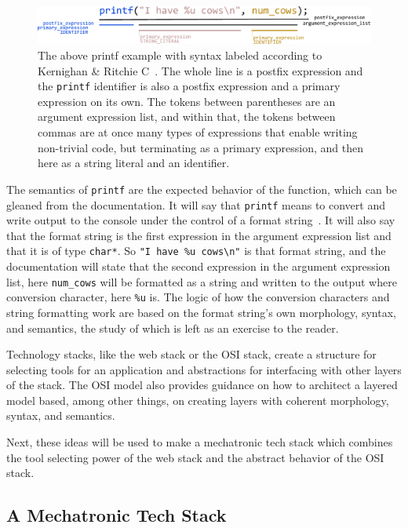 \documentclass[english,12pt,a4paper,pdftex,eng,utf8]{aaltothesis}
\begin{document}
\begin{figure}[h]
  \centering
  \includegraphics[width=\textwidth]{assets/printf_syntax}
  \cprotect\caption{The above printf example with syntax labeled according to Kernighan {\&} Ritchie C~\cite{Kernighan1978}.  The whole line is a postfix expression and the \verb|printf| identifier is also a postfix expression and a primary expression on its own.  The tokens between parentheses are an argument expression list, and within that, the tokens between commas are at once many types of expressions that enable writing non-trivial code, but terminating as a primary expression, and then here as a string literal and an identifier.}\label{fig:printf_syntax}
\end{figure}

The semantics of \verb|printf| are the expected behavior of the function, which can be gleaned from the documentation. It will say that \verb|printf| means to convert and write output to the console under the control of a format string~\cite{Kernighan1978}.  It will also say that the format string is the first expression in the argument expression list and that it is of type \verb|char*|.  So \verb|"I have %u cows\n"| is that format string, and the documentation will state that the second expression in the argument expression list, here \verb|num_cows| will be formatted as a string and written to the output where conversion character, here \verb|%u| is.  The logic of how the conversion characters and string formatting work are based on the format string's own morphology, syntax, and semantics, the study of which is left as an exercise to the reader.

Technology stacks, like the web stack or the OSI stack, create a structure for selecting tools for an application and abstractions for interfacing with other layers of the stack. The OSI model also provides guidance on how to architect a layered model based, among other things, on creating layers with coherent morphology, syntax, and semantics.

Next, these ideas will be used to make a mechatronic tech stack which combines the tool selecting power of the web stack and the abstract behavior of the OSI stack.

\subsection{A Mechatronic Tech Stack}
\end{document}
